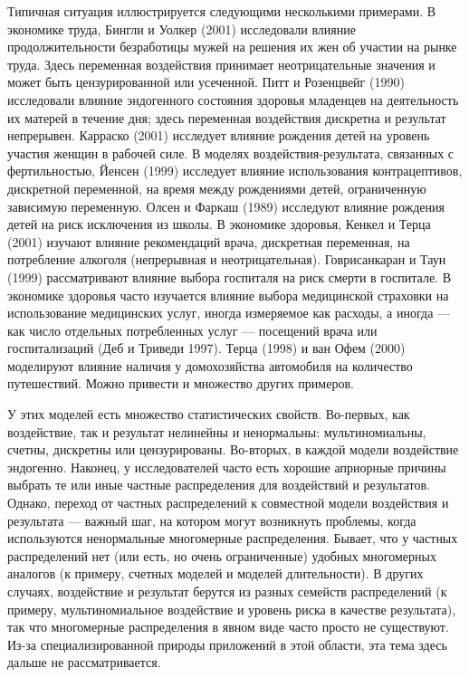 Типичная ситуация иллюстрируется следующими несколькими примерами. В экономике труда, Бингли и Уолкер (2001) исследовали влияние продолжительности безработицы мужей на решения их жен об участии на рынке труда. Здесь переменная воздействия принимает неотрицательные значения и может быть цензурированной или усеченной. Питт и Розенцвейг (1990) исследовали влияние эндогенного состояния здоровья младенцев на деятельность их матерей в течение дня; здесь переменная воздействия дискретна и результат непрерывен. Карраско (2001) исследует влияние рождения детей на уровень участия женщин в рабочей силе. В моделях воздействия-результата, связанных с фертильностью, Йенсен (1999) исследует влияние использования контрацептивов, дискретной переменной, на время между рождениями детей, ограниченную зависимую переменную. Олсен и Фаркаш (1989) исследуют влияние рождения детей на риск исключения из школы. В экономике здоровья, Кенкел и Терца (2001) изучают влияние рекомендаций врача, дискретная переменная, на потребление алкоголя (непрерывная и неотрицательная). Говрисанкаран и Таун (1999) рассматривают влияние выбора госпиталя на риск смерти в госпитале. В экономике здоровья часто изучается влияние выбора медицинской страховки  на использование медицинских услуг, иногда измеряемое как расходы, а иногда --- как число отдельных потребленных услуг --- посещений врача или госпитализаций (Деб и Триведи 1997). Терца (1998) и ван Офем (2000) моделируют влияние наличия у домохозяйства автомобиля на количество путешествий. Можно привести и множество других примеров. 

У этих моделей есть множество статистических свойств. Во-первых, как воздействие, так и результат нелинейны и ненормальны: мультиномиальны, счетны, дискретны или цензурированы. Во-вторых, в каждой модели воздействие эндогенно. Наконец, у исследователей часто есть хорошие априорные причины выбрать те или иные частные распределения для воздействий и результатов. Однако, переход от частных распределений к совместной модели воздействия и результата --- важный шаг, на котором могут возникнуть проблемы, когда используются ненормальные многомерные распределения. Бывает, что у частных распределений нет (или есть, но очень ограниченные) удобных многомерных аналогов (к примеру, счетных моделей и моделей длительности). В других случаях, воздействие и результат берутся из разных семейств распределений (к примеру, мультиномиальное воздействие и уровень риска в качестве результата), так что  многомерные распределения в явном виде часто просто не существуют. Из-за специализированной природы приложений в этой области, эта тема здесь дальше не рассматривается. 

